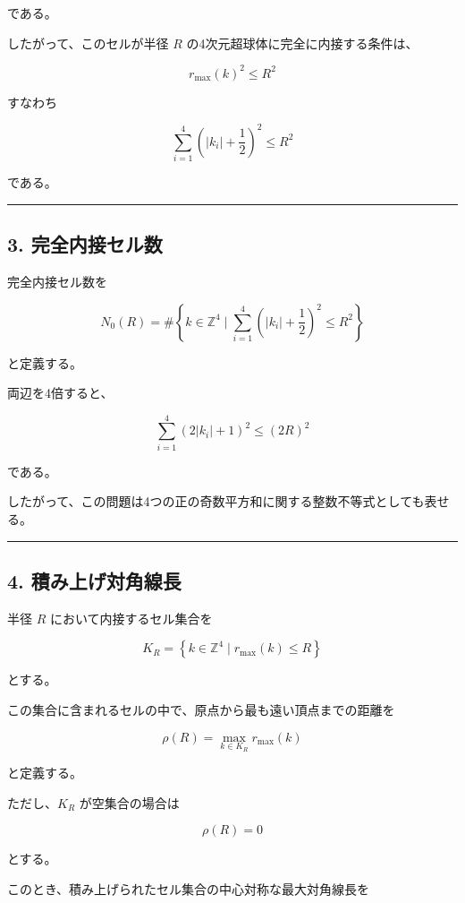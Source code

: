 \documentclass[
]{ltjsarticle}
\begin{document}
である。

したがって、このセルが半径 \(R\) の4次元超球体に完全に内接する条件は、

\[
r_{\max}(k)^2\le R^2
\]

すなわち

\[
\sum_{i=1}^{4}
\left(|k_i|+\frac12\right)^2
\le R^2
\]

である。

\begin{center}\rule{0.5\linewidth}{0.5pt}\end{center}

\subsection{3.
完全内接セル数}\label{ux5b8cux5168ux5185ux63a5ux30bbux30ebux6570}

完全内接セル数を

\[
N_0(R)
=
\#\left\{
k\in\mathbb{Z}^4
\mid
\sum_{i=1}^{4}
\left(|k_i|+\frac12\right)^2
\le R^2
\right\}
\]

と定義する。

両辺を4倍すると、

\[
\sum_{i=1}^{4}
(2|k_i|+1)^2
\le
(2R)^2
\]

である。

したがって、この問題は4つの正の奇数平方和に関する整数不等式としても表せる。

\begin{center}\rule{0.5\linewidth}{0.5pt}\end{center}

\subsection{4.
積み上げ対角線長}\label{ux7a4dux307fux4e0aux3052ux5bfeux89d2ux7ddaux9577}

半径 \(R\) において内接するセル集合を

\[
K_R=
\left\{
k\in\mathbb{Z}^4
\mid
r_{\max}(k)\le R
\right\}
\]

とする。

この集合に含まれるセルの中で、原点から最も遠い頂点までの距離を

\[
\rho(R)
=
\max_{k\in K_R} r_{\max}(k)
\]

と定義する。

ただし、\(K_R\) が空集合の場合は

\[
\rho(R)=0
\]

とする。

このとき、積み上げられたセル集合の中心対称な最大対角線長を
\end{document}
